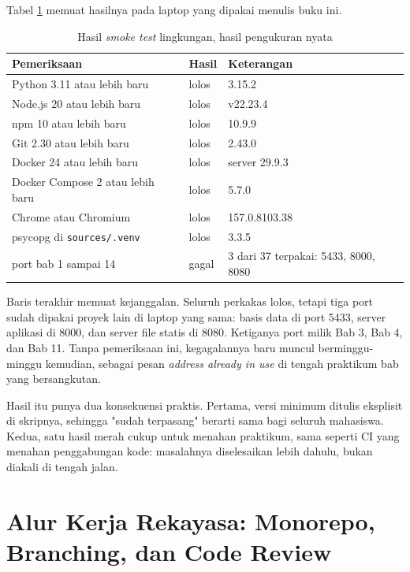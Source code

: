 Tabel \ref{tab:lingkungan01} memuat hasilnya pada laptop yang dipakai menulis
buku ini.

\begin{table}[!htb]
  \centering
  \caption{Hasil \textit{smoke test} lingkungan, hasil pengukuran nyata}
  \label{tab:lingkungan01}
  \begin{tabularx}{\textwidth}{XlX}
    \hline
    \textbf{Pemeriksaan} & \textbf{Hasil} & \textbf{Keterangan} \\
    \hline
    Python 3.11 atau lebih baru & lolos & 3.15.2 \\
    \hline
    Node.js 20 atau lebih baru & lolos & v22.23.4 \\
    \hline
    npm 10 atau lebih baru & lolos & 10.9.9 \\
    \hline
    Git 2.30 atau lebih baru & lolos & 2.43.0 \\
    \hline
    Docker 24 atau lebih baru & lolos & server 29.9.3 \\
    \hline
    Docker Compose 2 atau lebih baru & lolos & 5.7.0 \\
    \hline
    Chrome atau Chromium & lolos & 157.0.8103.38 \\
    \hline
    psycopg di \texttt{sources/.venv} & lolos & 3.3.5 \\
    \hline
    port bab 1 sampai 14 & gagal & 3 dari 37 terpakai: 5433, 8000, 8080 \\
    \hline
  \end{tabularx}
\end{table}

Baris terakhir memuat kejanggalan. Seluruh perkakas lolos, tetapi tiga port
sudah dipakai proyek lain di laptop yang sama: basis data di port 5433, server
aplikasi di 8000, dan server file statis di 8080. Ketiganya port milik Bab 3,
Bab 4, dan Bab 11. Tanpa pemeriksaan ini, kegagalannya baru muncul berminggu-minggu
kemudian, sebagai pesan \textit{address already in use} di tengah praktikum
bab yang bersangkutan.

Hasil itu punya dua konsekuensi praktis. Pertama, versi minimum ditulis
eksplisit di skripnya, sehingga "sudah terpasang" berarti sama bagi seluruh
mahasiswa. Kedua, satu hasil merah cukup untuk menahan praktikum, sama
seperti CI yang menahan penggabungan kode: masalahnya diselesaikan lebih
dahulu, bukan diakali di tengah jalan.

\section{Alur Kerja Rekayasa: Monorepo, Branching, dan Code Review}


